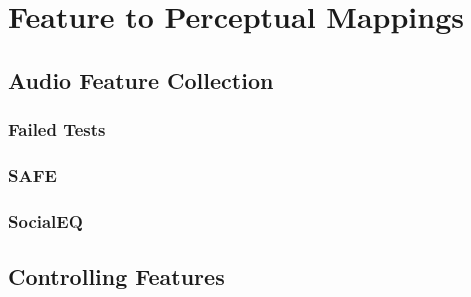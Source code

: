 
\chapter{Feature to Perceptual Mappings}
\label{chap:PerceptualControl}

\section{Audio Feature Collection}
\label{sec:PerceptualControl-FeatureCollecton}

	\subsection{Failed Tests}
	\label{sec:PerceptualControl-FailedTests}

	\subsection{SAFE}
	\label{sec:PerceptualControl-SAFE}

	\subsection{SocialEQ}
	\label{sec:PercpetualControl-SocialEQ}

\section{Controlling Features}
\label{chap:PerceptualControl-Control}

